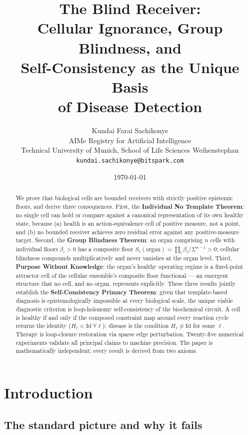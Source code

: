 \documentclass[twocolumn,11pt,a4paper]{article}
\title{\textbf{The Blind Receiver:\\
Cellular Ignorance, Group Blindness, and\\
Self-Consistency as the Unique Basis\\
of Disease Detection}}
\author{Kundai Farai Sachikonye\\[2pt]
\small AIMe Registry for Artificial Intelligence\\
\small Technical University of Munich,
School of Life Sciences Weihenstephan\\
\small \texttt{kundai.sachikonye@bitspark.com}}
\date{\today}
\begin{document}
\maketitle

\begin{abstract}
\noindent We prove that biological cells are bounded receivers with strictly
positive epistemic floors, and derive three consequences. First, the
\textbf{Individual No Template Theorem}: no single cell can hold or compare
against a canonical representation of its own healthy state, because (a) health
is an action-equivalence cell of positive measure, not a point, and (b) no
bounded receiver achieves zero residual error against any positive-measure
target. Second, the \textbf{Group Blindness Theorem}: an organ comprising $n$
cells with individual floors $\beta_i > 0$ has a composite floor
$S_\flat(\mathrm{organ}) = \prod_i \beta_i / \Sigma^{n-1} > 0$; cellular
blindness compounds multiplicatively and never vanishes at the organ level.
Third, \textbf{Purpose Without Knowledge}: the organ's healthy operating
regime is a fixed-point attractor cell of the cellular ensemble's composite
floor functional --- an emergent structure that no cell, and no organ,
represents explicitly. These three results jointly establish the
\textbf{Self-Consistency Primacy Theorem}: given that template-based diagnosis
is epistemologically impossible at every biological scale, the unique viable
diagnostic criterion is loop-holonomy self-consistency of the biochemical
circuit. A cell is healthy if and only if the composed constraint map around
every reaction cycle returns the identity ($H_\ell = \mathrm{Id}\ \forall\ell$);
disease is the condition $H_\ell \neq \mathrm{Id}$ for some $\ell$. Therapy
is loop-closure restoration via sparse edge perturbation. Twenty-five numerical
experiments validate all principal claims to machine precision. The paper
is mathematically independent; every result is derived from two axioms.
\end{abstract}

\section{Introduction}
\label{sec:intro}

\subsection{The standard picture and why it fails}
\end{document}
